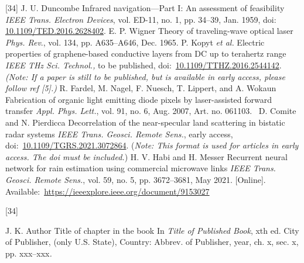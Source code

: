 \documentclass{IEEEtaes}
\begin{document}
\vspace*{-12pt}
\begin{thebibliography}{[34]}
\setcounter{enumiv}{0}
J. U. Duncombe
\newblock Infrared navigation---Part I: An assessment of feasibility
\newblock \emph{IEEE Trans. Electron Devices}, vol. ED-11, no. 1, pp. 34--39, Jan. 1959, doi: \href{https://dx.doi.org/10.1109/TED.2016.2628402}{10.1109/TED.2016.2628402}.
E. P. Wigner	
\newblock Theory of traveling-wave optical laser
\newblock \emph{Phys. Rev}., vol. 134, pp. A635--A646, Dec. 1965.
P. Kopyt \emph{et al.}
\newblock Electric properties of graphene-based conductive layers from DC up to terahertz range
\newblock \emph{IEEE THz Sci. Technol.,} to be published, 
doi:~\href{https://dx.doi.org/10.1109/TTHZ.2016.2544142}{\url{10.1109/TTHZ.2016.2544142}}.
\emph{(Note: If a paper is still to be published, but is available in early access, please follow ref {[}5{]}.)}
R. Fardel, M. Nagel, F. Nuesch, T. Lippert, and A. Wokaun
\newblock  Fabrication of organic light emitting diode pixels by laser-assisted forward transfer
\newblock \emph{Appl. Phys. Lett.}, vol. 91, no. 6, Aug. 2007, Art. no. 061103.~
D. Comite and N. Pierdicca
\newblock Decorrelation of the near-specular land scattering in bistatic radar systems
\newblock \emph{IEEE Trans. Geosci. Remote Sens.}, early access, doi:~\href{https://dx.doi.org/10.1109/TGRS.2021.3072864}{\url{10.1109/TGRS.2021.3072864}}. (\emph{Note: This format is used for articles in early access. The doi must be included.})
H. V. Habi and H. Messer
\newblock Recurrent neural network for rain estimation using commercial microwave links
\newblock \emph{IEEE Trans. Geosci. Remote Sens.}, vol. 59, no. 5, pp. 3672--3681, May 2021. {[}Online{]}. Available:~\href{https://ieeexplore.ieee.org/document/9153027}{\url{https://ieeexplore.ieee.org/document/9153027}}
\end{thebibliography}


\vspace*{-12pt}
\begin{thebibliography}{[34]}
\item[] J. K. Author
\newblock Title of chapter in the book
\newblock In \emph{Title of Published Book}, xth ed. City of Publisher, (only U.S. State), Country: Abbrev. of Publisher, year, ch. x, sec. {x}, pp. xxx--xxx\emph{.}
\end{thebibliography}
\end{document}
